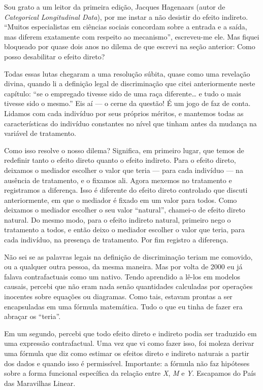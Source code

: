 \documentclass[11pt,a5paper,twoside]{book}
\begin{document}
Sou grato a um leitor da primeira edição, Jacques Hagenaars (autor de \textit{Categorical Longitudinal Data}), por me instar a não desistir do efeito indireto. “Muitos especialistas em ciências sociais concordam sobre a entrada e a saída, mas diferem exatamente com respeito ao mecanismo”, escreveu-me ele. Mas fiquei bloqueado por quase dois anos no dilema de que escrevi na seção anterior: Como posso desabilitar o efeito direto?

Todas essas lutas chegaram a uma resolução súbita, quase como uma revelação divina, quando li a definição legal de discriminação que citei anteriormente neste capítulo: “se o empregado tivesse sido de uma raça diferente… e tudo o mais tivesse sido o mesmo.” Eis aí — o cerne da questão! É um jogo de faz de conta. Lidamos com cada indivíduo por seus próprios méritos, e mantemos todas as características do indivíduo constantes no nível que tinham antes da mudança na variável de tratamento.

Como isso resolve o nosso dilema? Significa, em primeiro lugar, que temos de redefinir tanto o efeito direto quanto o efeito indireto. Para o efeito direto, deixamos o mediador escolher o valor que teria — para cada indivíduo — na ausência de tratamento, e o fixamos ali. Agora mexemos no tratamento e registramos a diferença. Isso é diferente do efeito direto controlado que discuti anteriormente, em que o mediador é fixado em um valor para todos. Como deixamos o mediador escolher o seu valor “natural”, chamei-o de efeito direto natural. Do mesmo modo, para o efeito indireto natural, primeiro nego o tratamento a todos, e então deixo o mediador escolher o valor que teria, para cada indivíduo, na presença de tratamento. Por fim registro a diferença.

Não sei se as palavras legais na definição de discriminação teriam me comovido, ou a qualquer outra pessoa, da mesma maneira. Mas por volta de 2000 eu já falava contrafactuais como um nativo. Tendo aprendido a lê-los em modelos causais, percebi que não eram nada senão quantidades calculadas por operações inocentes sobre equações ou diagramas. Como tais, estavam prontas a ser encapsuladas em uma fórmula matemática. Tudo o que eu tinha de fazer era abraçar os “teria”.

Em um segundo, percebi que todo efeito direto e indireto podia ser traduzido em uma expressão contrafactual. Uma vez que vi como fazer isso, foi moleza derivar uma fórmula que diz como estimar os efeitos direto e indireto naturais a partir dos dados e quando isso é permissível. Importante: a fórmula não faz hipóteses sobre a forma funcional específica da relação entre \textit{X}, \textit{M} e \textit{Y}. Escapamos do País das Maravilhas Linear.
\end{document}
